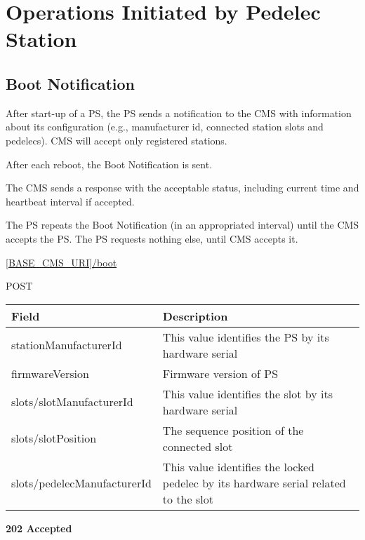 \section{Operations Initiated by Pedelec Station}

\subsection{Boot Notification}

After start-up of a \acs{PS}, the \acs{PS} sends a notification to the \acs{CMS} with information about its configuration (e.g., manufacturer id, connected station slots and pedelecs). \acs{CMS} will accept only registered stations. 

After each reboot, the Boot Notification is sent.

The \acs{CMS} sends a response with the acceptable status, including current time and heartbeat interval if accepted.

The \acs{PS} repeats the Boot Notification (in an appropriated interval) until the \acs{CMS} accepts the \acs{PS}. The \acs{PS} requests nothing else, until \acs{CMS} accepts it.


 \url{[BASE_CMS_URI]/boot}

 POST

\begin{table}[!h]
\vspace{-7mm}
\begin{tabularx}{\linewidth}{ | l | X | }
  \hline
  \rowcolor{table-head}
  Field & Description \\
  \hline
  stationManufacturerId 		& This value identifies the \acs{PS} by its hardware serial \\
  firmwareVersion			& Firmware version of \acs{PS}\\
  slots/slotManufacturerId 	& This value identifies the slot by its hardware serial \\
  slots/slotPosition			& The sequence position of the connected slot \\
  slots/pedelecManufacturerId & This value identifies the locked pedelec by its hardware serial related to the slot \\
    \hline
\end{tabularx}
\end{table}

\textbf{202 Accepted}

